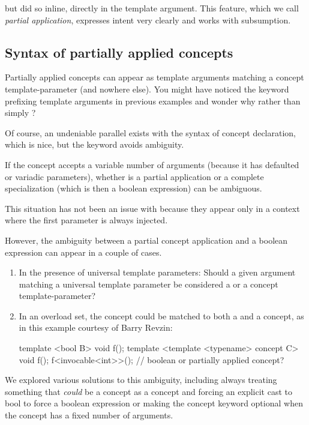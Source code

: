 \documentclass{wg21}
\begin{document}
but did so inline, directly in the template argument.
This feature, which we call \emph{partial application}, expresses intent very clearly and works with subsumption.

\subsection{Syntax of partially applied concepts}

Partially applied concepts can appear as template arguments matching a concept template-parameter (and nowhere else).
You might have noticed the  keyword prefixing template arguments in previous examples and wonder why  rather than simply ?

Of course, an undeniable parallel exists with the syntax of concept declaration, which is nice, but the keyword avoids ambiguity.

If the concept accepts a variable number of arguments (because it has defaulted or variadic parameters),
whether  is a partial application or a complete specialization
(which is then a boolean expression) can be ambiguous.

This situation has not been an issue with  because they appear only in a context where the first parameter is always injected.

However, the ambiguity between a partial concept application and a boolean expression can appear in a couple of cases.
\begin{enumerate}
    \item In the presence of universal template parameters: Should a given argument matching a universal template parameter
    be considered a  or a concept template-parameter?
    \item In an overload set, the concept could be matched to both a  and a concept, as in this example courtesy of Barry Revzin:
\begin{colorblock}
template <bool B> void f();
template <template <typename> concept C> void f();
f<invocable<int>>(); // boolean or partially applied concept?
\end{colorblock}
\end{enumerate}

We explored various solutions to this ambiguity, including always treating something that \emph{could} be a concept as a concept
and forcing an explicit cast to bool to force a boolean expression or making the concept keyword optional when the concept has a fixed number of arguments.
\end{document}
